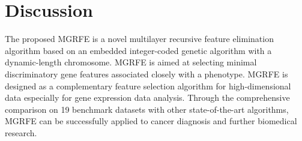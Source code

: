 \documentclass[10pt,journal,compsoc]{IEEEtran}
\begin{document}
	\section{Discussion}
	
	The proposed MGRFE is a novel multilayer recursive feature elimination algorithm based on an embedded integer-coded genetic algorithm with a dynamic-length chromosome. MGRFE is aimed at selecting minimal discriminatory gene features associated closely with a phenotype. 
	MGRFE is designed as a complementary feature selection algorithm for high-dimensional data especially for gene expression data analysis. 
	Through the comprehensive comparison on 19 benchmark datasets with other state-of-the-art algorithms, MGRFE can  be successfully applied to cancer diagnosis and further biomedical research.
	
\end{document}
